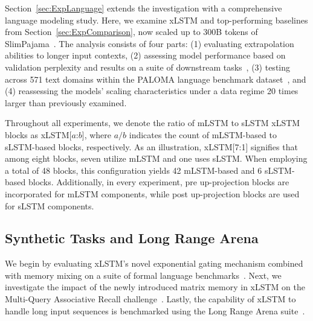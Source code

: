 Section~\ref{sec:ExpLanguage} extends the investigation with a comprehensive language modeling study. Here, we examine xLSTM and top-performing baselines from Section~\ref{sec:ExpComparison}, now scaled up to 300B tokens of SlimPajama~\citep{Soboleva:23}. The analysis consists of four parts: (1) evaluating extrapolation abilities to longer input contexts, (2) assessing model performance based on validation perplexity and results on a suite of downstream tasks~\citep{Sutawika:24}, (3) testing across 571 text domains within the PALOMA language benchmark dataset~\citep{Magnusson:23arxivshort}, and (4) reassessing the models' scaling characteristics under a data regime 20 times larger than previously examined.

\label{sec:xlstm_blocks_notation}
Throughout all experiments, we denote the ratio of mLSTM to sLSTM xLSTM blocks as xLSTM[$a$:$b$], where $a/b$ indicates the count of mLSTM-based to sLSTM-based blocks, respectively. As an illustration, xLSTM[7:1] signifies that among eight blocks, seven utilize mLSTM and one uses sLSTM. When employing a total of 48 blocks, this configuration yields 42 mLSTM-based and 6 sLSTM-based blocks. Additionally, in every experiment, pre up-projection blocks are incorporated for mLSTM components, while post up-projection blocks are used for sLSTM components.

\subsection{Synthetic Tasks and Long Range Arena}
\label{sec:ExpSyntethic}
We begin by evaluating xLSTM’s novel exponential gating mechanism combined with memory mixing on a suite of formal language benchmarks~\citep{Deletang:23}. Next, we investigate the impact of the newly introduced matrix memory in xLSTM on the Multi-Query Associative Recall challenge~\citep{Arora:23arxiv}. Lastly, the capability of xLSTM to handle long input sequences is benchmarked using the Long Range Arena suite~\citep{Tay:21}.

